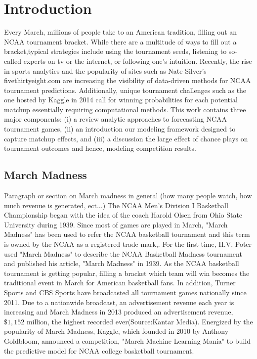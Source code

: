 \section{Introduction}
 Every March, millions of people take to an American tradition, filling out an NCAA tournament bracket.  While there are a multitude of ways to fill out a bracket,typical strategies include using the tournament seeds, listening to so-called experts on tv or the internet, or following one's intuition.  Recently, the rise in sports analytics and the popularity of sites such as Nate Silver's fivethirtyeight.com are increasing the visibility of data-driven methods for NCAA tournament predictions.  Additionally, unique tournament challenges such as the one hosted by Kaggle in 2014 call for winning probabilities for each potential matchup essentially requiring computational methods.  This work contains three major components: (i) a review analytic approaches to forecasting NCAA tournament games, (ii) an introduction our modeling framework designed to capture matchup effects, and (iii) a discussion the large effect of chance plays on tournament outcomes and hence, modeling competition results.
   
\subsection{March Madness}  Paragraph or section on March madness in general (how many people watch, how much revenue is generated, ect...)
The NCAA Men's Division I Basketball Championship began with the idea of the coach Harold Olsen from Ohio State University during 1939. Since most of games are played in March, "March Madness" has been used to refer the NCAA basketball tournament and this term is owned by the NCAA as a registered trade mark,.
For the first time, H.V. Poter used "March Madness" to describe the NCAA Basketball Madness tournament and published his article, "March Madness" in 1939. As the NCAA basketball tournament is getting popular, filling a bracket which team will win becomes the traditional event in March for American basketball fans. In addition, Turner Sports and CBS Sports have broadcasted all tournament games nationally since 2011. Due to a nationwide broadcast, an advertisement revenue each year is increasing and March Madness in 2013 produced an advertisement revenue,$\$ 1,152$ million, the highest recorded ever(Source:Kantar Media).
Energized by the popularity of March Madness, Kaggle, which founded in 2010 by Anthony Goldbloom, announced a competition, "March Machine Learning Mania" to build the predictive model for NCAA college basketball tournament.

